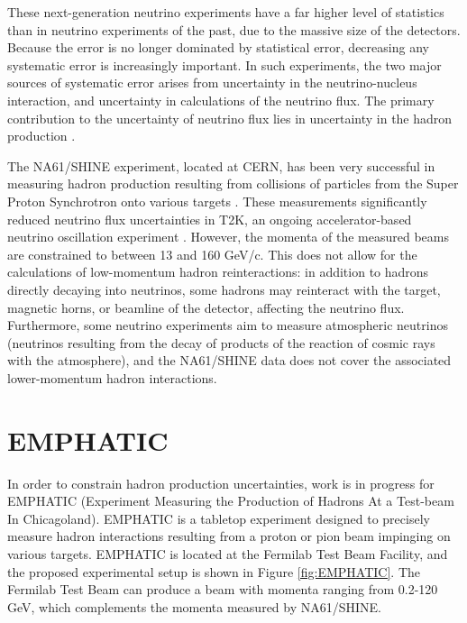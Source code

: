 These next-generation neutrino experiments have a far higher level of statistics than in neutrino experiments of the past, due to the massive size of the detectors.
Because the error is no longer dominated by statistical error, decreasing any systematic error is increasingly important.
In such experiments, the two major sources of systematic error arises from uncertainty in the neutrino-nucleus interaction, and uncertainty in calculations of the neutrino flux.
The primary contribution to the uncertainty of neutrino flux lies in uncertainty in the hadron production \cite{hyperKDesign}.

The NA61/SHINE experiment, located at CERN, has been very successful in measuring hadron production resulting from collisions of particles from the Super Proton Synchrotron onto various targets \cite{na61}.
These measurements significantly reduced neutrino flux uncertainties in T2K, an ongoing accelerator-based neutrino oscillation experiment \cite{na61T2K}. 
However, the momenta of the measured beams are constrained to between 13 and 160 GeV/c.
This does not allow for the calculations of low-momentum hadron reinteractions: in addition to hadrons directly decaying into neutrinos, some hadrons may reinteract with the target, magnetic horns, or beamline of the detector, affecting the neutrino flux.
Furthermore, some neutrino experiments aim to measure atmospheric neutrinos (neutrinos resulting from the decay of products of the reaction of cosmic rays with the atmosphere), and the NA61/SHINE data does not cover the associated lower-momentum hadron interactions.

 \section{\ac{EMPHATIC}}

In order to constrain hadron production uncertainties, work is in progress for EMPHATIC (Experiment Measuring the Production of Hadrons At a Test-beam In Chicagoland).
EMPHATIC is a tabletop experiment designed to precisely measure hadron interactions resulting from a proton or pion beam impinging on various targets. 
EMPHATIC is located at the Fermilab Test Beam Facility, and the proposed experimental setup is shown in Figure \ref{fig:EMPHATIC}.
The Fermilab Test Beam can produce a beam with momenta ranging from 0.2-120 GeV, which complements the momenta measured by NA61/SHINE.

